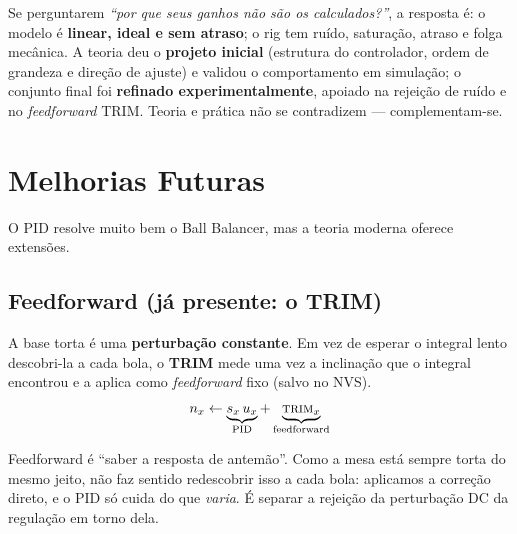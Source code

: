 \begin{projeto}
Se perguntarem \emph{``por que seus ganhos n\~ao s\~ao os calculados?''}, a resposta
\'e: o modelo \'e \textbf{linear, ideal e sem atraso}; o rig tem ru\'ido,
satura\c{c}\~ao, atraso e folga mec\^anica. A teoria deu o \textbf{projeto inicial}
(estrutura do controlador, ordem de grandeza e dire\c{c}\~ao de ajuste) e validou o
comportamento em simula\c{c}\~ao; o conjunto final foi \textbf{refinado
experimentalmente}, apoiado na rejei\c{c}\~ao de ru\'ido e no \emph{feedforward}
TRIM. Teoria e pr\'atica n\~ao se contradizem --- complementam-se.
\end{projeto}

\chapter{Melhorias Futuras}\label{cap:futuro}

O PID resolve muito bem o Ball Balancer, mas a teoria moderna oferece extens\~oes.

\section{Feedforward (j\'a presente: o TRIM)}
A base torta \'e uma \textbf{perturba\c{c}\~ao constante}. Em vez de esperar o
integral lento descobri-la a cada bola, o \textbf{TRIM} mede uma vez a inclina\c{c}\~ao
que o integral encontrou e a aplica como \emph{feedforward} fixo (salvo no NVS).
\begin{equation}
n_x \leftarrow \underbrace{s_x\,u_x}_{\text{PID}} + \underbrace{\textsc{trim}_x}_{\text{feedforward}}
\end{equation}
\begin{intuicao}
Feedforward \'e ``saber a resposta de antem\~ao''. Como a mesa est\'a sempre torta
do mesmo jeito, n\~ao faz sentido redescobrir isso a cada bola: aplicamos a
corre\c{c}\~ao direto, e o PID s\'o cuida do que \emph{varia}. \'E separar a
rejei\c{c}\~ao da perturba\c{c}\~ao DC da regula\c{c}\~ao em torno dela.
\end{intuicao}

